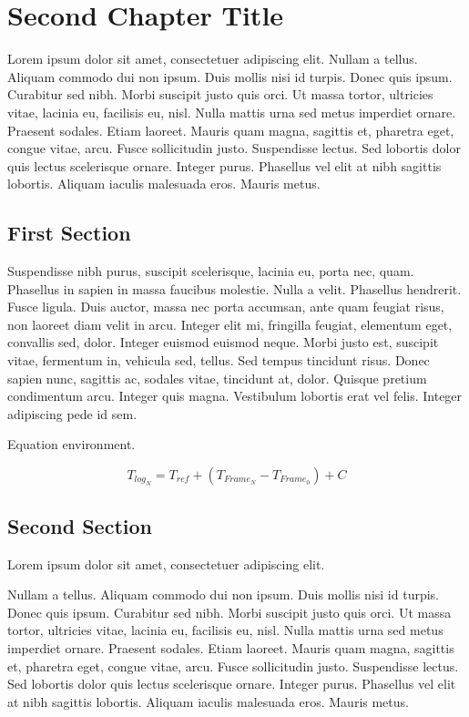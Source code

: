 \chapter{Second Chapter Title}
\label{c:chapter2} Lorem ipsum dolor sit amet, consectetuer adipiscing elit.
Nullam a tellus. Aliquam commodo dui non ipsum. Duis mollis nisi id turpis.
Donec quis ipsum. Curabitur sed nibh. Morbi suscipit justo quis orci. Ut massa
tortor, ultricies vitae, lacinia eu, facilisis eu, nisl. Nulla mattis urna sed
metus imperdiet ornare. Praesent sodales. Etiam laoreet. Mauris quam magna,
sagittis et, pharetra eget, congue vitae, arcu. Fusce sollicitudin justo.
Suspendisse lectus. Sed lobortis dolor quis lectus scelerisque ornare. Integer
purus. Phasellus vel elit at nibh sagittis lobortis. Aliquam iaculis malesuada
eros. Mauris metus.

\section{First Section}
\label{st:problemstatement} Suspendisse nibh purus, suscipit scelerisque,
lacinia eu, porta nec, quam. Phasellus in sapien in massa faucibus molestie.
Nulla a velit. Phasellus hendrerit. Fusce ligula. Duis auctor, massa nec porta
accumsan, ante quam feugiat risus, non laoreet diam velit in arcu. Integer elit
mi, fringilla feugiat, elementum eget, convallis sed, dolor. Integer euismod
euismod neque. Morbi justo est, suscipit vitae, fermentum in, vehicula sed,
tellus. Sed tempus tincidunt risus. Donec sapien nunc, sagittis ac, sodales
vitae, tincidunt at, dolor. Quisque pretium condimentum arcu. Integer quis
magna. Vestibulum lobortis erat vel felis. Integer adipiscing pede id sem.

Equation environment.

\begin{equation}
\mbox{$T_{log_{N}}$} =
\mbox{$T_{ref}$} + (\mbox{$T_{Frame_{N}}$} - \mbox{$T_{Frame_{0}}$})
+ \mbox{$C$}
\label{eq:log}
\end{equation}

\section{Second Section}
\label{st:discussion} 
Lorem ipsum dolor sit amet, consectetuer adipiscing elit.

Nullam a tellus. Aliquam commodo dui non ipsum. Duis mollis nisi id turpis.
Donec quis ipsum. Curabitur sed nibh. Morbi suscipit justo quis orci. Ut massa
tortor, ultricies vitae, lacinia eu, facilisis eu, nisl. Nulla mattis urna sed
metus imperdiet ornare. Praesent sodales. Etiam laoreet. Mauris quam magna,
sagittis et, pharetra eget, congue vitae, arcu. Fusce sollicitudin justo.
Suspendisse lectus. Sed lobortis dolor quis lectus scelerisque ornare. Integer
purus. Phasellus vel elit at nibh sagittis lobortis. Aliquam iaculis malesuada
eros. Mauris metus.

